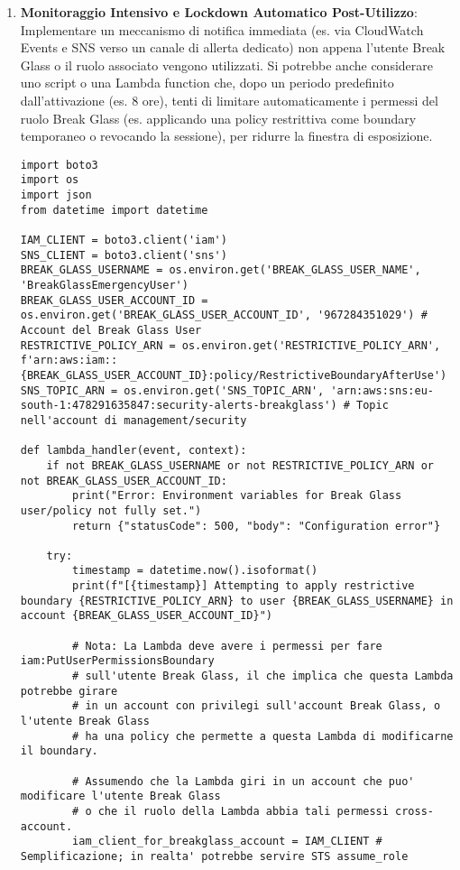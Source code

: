 \begin{enumerate}
    \item \textbf{Monitoraggio Intensivo e Lockdown Automatico Post-Utilizzo}: Implementare un meccanismo di notifica immediata (es. via CloudWatch Events e SNS verso un canale di allerta dedicato) non appena l'utente Break Glass o il ruolo associato vengono utilizzati. Si potrebbe anche considerare uno script o una Lambda function che, dopo un periodo predefinito dall'attivazione (es. 8 ore), tenti di limitare automaticamente i permessi del ruolo Break Glass (es. applicando una policy restrittiva come boundary temporaneo o revocando la sessione), per ridurre la finestra di esposizione.
    \begin{lstlisting}[style=python, caption={Esempio concettuale Lambda per limitare utente Break Glass}, label=lst:breakglass-lambda-iam]
import boto3
import os
import json
from datetime import datetime

IAM_CLIENT = boto3.client('iam')
SNS_CLIENT = boto3.client('sns')
BREAK_GLASS_USERNAME = os.environ.get('BREAK_GLASS_USER_NAME', 'BreakGlassEmergencyUser')
BREAK_GLASS_USER_ACCOUNT_ID = os.environ.get('BREAK_GLASS_USER_ACCOUNT_ID', '967284351029') # Account del Break Glass User
RESTRICTIVE_POLICY_ARN = os.environ.get('RESTRICTIVE_POLICY_ARN', f'arn:aws:iam::{BREAK_GLASS_USER_ACCOUNT_ID}:policy/RestrictiveBoundaryAfterUse')
SNS_TOPIC_ARN = os.environ.get('SNS_TOPIC_ARN', 'arn:aws:sns:eu-south-1:478291635847:security-alerts-breakglass') # Topic nell'account di management/security

def lambda_handler(event, context):
    if not BREAK_GLASS_USERNAME or not RESTRICTIVE_POLICY_ARN or not BREAK_GLASS_USER_ACCOUNT_ID:
        print("Error: Environment variables for Break Glass user/policy not fully set.")
        return {"statusCode": 500, "body": "Configuration error"}

    try:
        timestamp = datetime.now().isoformat()
        print(f"[{timestamp}] Attempting to apply restrictive boundary {RESTRICTIVE_POLICY_ARN} to user {BREAK_GLASS_USERNAME} in account {BREAK_GLASS_USER_ACCOUNT_ID}")
        
        # Nota: La Lambda deve avere i permessi per fare iam:PutUserPermissionsBoundary
        # sull'utente Break Glass, il che implica che questa Lambda potrebbe girare
        # in un account con privilegi sull'account Break Glass, o l'utente Break Glass
        # ha una policy che permette a questa Lambda di modificarne il boundary.
        
        # Assumendo che la Lambda giri in un account che puo' modificare l'utente Break Glass
        # o che il ruolo della Lambda abbia tali permessi cross-account.
        iam_client_for_breakglass_account = IAM_CLIENT # Semplificazione; in realta' potrebbe servire STS assume_role
        

\end{lstlisting}
\end{enumerate}

